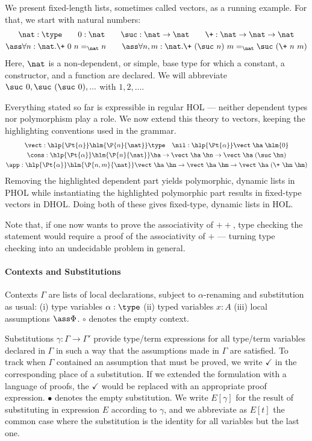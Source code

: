 \begin{example}\label{ex:vectors}
We present fixed-length lists, sometimes called vectors, as a
running example. For that, we start with natural
numbers:
\begin{gather*}
  \nat :\type
  \qquad 0:\nat
  \qquad \suc:\nat\to\nat
  \qquad\+:\nat\to\nat\to\nat\\
  \ass\forall n:\nat.\+\ 0\ n =_{\nat} n
  \qquad \ass\forall n, m:\nat.\+\ (\suc\ n)\ m=_{\nat} \suc\ (\+\ n\ m)
\end{gather*}
Here, \(\nat\) is a non-dependent, or simple, base type for which a constant, a constructor, and
a function are declared. We will abbreviate \(\suc\ 0, \suc\ (\suc\ 0), ...\) with \(1,
2, ...\).

Everything stated so far is expressible in regular HOL --- neither dependent types nor
polymorphism play a role. We now extend this theory to vectors, keeping the highlighting
conventions used in the grammar.
\begin{gather*}
  \vect:\hlp{\Pt{\alpha}}\hlm{\P{n}{\nat}}\type
  \quad \nil:\hlp{\Pt{\alpha}}\vect\;\ha\;\hlm{0}\\
  \cons:\hlp{\Pt{\alpha}}\hlm{\P{n}{\nat}}\ha\to\vect\;\ha\;\hn\to\vect\;\ha\;(\suc\;\hn)\\
  \app:\hlp{\Pt{\alpha}}\hlm{\P{n,m}{\nat}}\vect\;\ha\;\hn\to\vect\;\ha\;\hm\to\vect\;\ha\;(\+\
  \hn\;\hm)
\end{gather*}
Removing the highlighted dependent part yields polymorphic, dynamic lists in PHOL while
instantiating the highlighted polymorphic part results in fixed-type vectors in DHOL. Doing
both of these gives fixed-type, dynamic lists in HOL. 

Note that, if one now wants to prove the associativity of \(++\), type checking the
statement would require a proof of the associativity of \(+\) --- turning type checking into an
undecidable problem in general.
\end{example}

\paragraph*{Contexts and Substitutions}
Contexts \(\Gamma\) are lists of local declarations, subject to $\alpha$-renaming and
substitution as usual: (i) type variables $\alpha:\type$ (ii) typed variables \(x:A\) (iii)
local assumptions $\ass \Phi$. 
\(\circ\) denotes the empty context.

Substitutions $\gamma:\Gamma\to\Gamma'$ provide type/term expressions for all type/term variables declared in $\Gamma$ in such a way that the assumptions made in $\Gamma$ are satisfied.
To track when $\Gamma$ contained an assumption that must be proved, we write $\checkmark$ in the corresponding place of a substitution.
If we extended the formulation with a language of proofs, the $\checkmark$ would be replaced
with an appropriate proof expression.
\(\bullet\) denotes the empty substitution.
We write $E[\gamma]$ for the result of substituting in expression $E$ according to $\gamma$, and
we abbreviate as $E[t]$ the common case where the substitution is the identity for all
variables but the last one.

